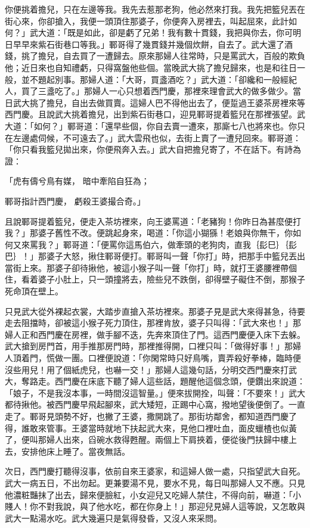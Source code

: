 你便挑着擔兒，只在左邊等我。我先去惹那老狗，他必然來打我。我先把籃兒丟在街心來，你卻搶入，我便一頭頂住那婆子，你便奔入房裡去，叫起屈來，此計如何？」武大道：「既是如此，卻是虧了兄弟！我有數十貫錢，我把與你去，你可明日早早來紫石街巷口等我。」鄆哥得了幾貫錢并幾個炊餅，自去了。武大還了酒錢，挑了擔兒，自去買了一遭歸去。原來那婦人往常時，只是罵武大，百般的欺負他；近日來也自知禮虧，只得窩盤他些個。當晚武大挑了擔兒歸來，也是和往日一般，並不題起別事。那婦人道：「大哥，買盞酒吃？」武大道：「卻纔和一般經紀人，買了三盞吃了。」那婦人一心只想着西門慶，那裡來理會武大的做多做少。當日武大挑了擔兒，自出去做買賣。這婦人巴不得他出去了，便踅過王婆茶房裡來等西門慶。且說武大挑着擔兒，出到紫石街巷口，迎見鄆哥提着籃兒在那裡張望。武大道：「如何？」鄆哥道：「還早些個，你自去賣一遭來，那廝七八也將來也。你只在左邊處伺候，不可遠去了。」武大雲飛也似，去街上賣了一遭兒回來。鄆哥道：「你只看我籃兒拋出來，你便飛奔入去。」武大自把擔兒寄了，不在話下。有詩為證：

「虎有儔兮鳥有媒，  暗中牽陷自狂為；

鄆哥指計西門慶，  虧殺王婆撮合奇。」

且說鄆哥提着籃兒，便走入茶坊裡來，向王婆罵道：「老豬狗！你昨日為甚麼便打我？」那婆子舊性不改。便跳起身來，喝道：「你這小猢猻！老娘與你無干，你如何又來罵我？」鄆哥道：「便罵你這馬伯六，做牽頭的老狗肉，直我｛髟巳｝｛髟巴｝！」那婆子大怒，揪住鄆哥便打。鄆哥叫一聲「你打」時，把那手中籃兒丟出當街上來。那婆子卻待揪他，被這小猴子叫一聲「你打」時，就打王婆腰裡帶個住，看着婆子小肚上，只一頭撞將去，險些兒不跌倒，卻得壁子礙住不倒，那猴子死命頂在壁上。

只見武大從外裸起衣裳，大踏步直搶入茶坊裡來。那婆子見是武大來得甚急，待要走去阻擋時，卻被這小猴子死力頂住，那裡肯放，婆子只叫得：「武大來也！」那婦人正和西門慶在房裡，做手腳不迭，先奔來頂住了門。這西門慶便入床下去躲。武大搶到房門首，用手推那房門時，那裡推得開，口裡只叫：「做得好事！」那婦人頂着門，慌做一團。口裡便說道：「你閑常時只好鳥嘴，賣弄殺好拳棒，臨時便沒些用兒！用了個紙虎兒，也嚇一交！」那婦人這幾句話，分明交西門慶來打武大，奪路走。西門慶在床底下聽了婦人這些話，題醒他這個念頭，便鑽出來說道：「娘子，不是我沒本事，一時間沒這智量。」便來拔開拴，叫聲：「不要來！」武大都待揪他。被西門慶早飛起腳來，武大矮短，正踢中心窩，撥地望後便倒了。一直走了。鄆哥見頭勢不好，也撇了王婆，撒開跳了。那街坊鄰舍，都知道西門慶了得，誰敢來管事。王婆當時就地下扶起武大來，見他口裡吐血，面皮蠟楂也似黃了，便叫那婦人出來，舀碗水救得甦醒。兩個上下肩挾着，便從後門扶歸中樓上去，安排他床上睡了。當夜無話。

次日，西門慶打聽得沒事，依前自來王婆家，和這婦人做一處，只指望武大自死。武大一病五日，不出勿起。更兼要湯不見，要水不見，每日叫那婦人又不應。只見他濃粧豔抹了出去，歸來便臉紅，小女迎兒又吃婦人禁住，不得向前，嚇道：「小賤人！你不對我說，與了他水吃，都在你身上！」那迎兒見婦人這等說，又怎敢與武大一點湯水吃。武大幾遍只是氣得發昏，又沒人來采問。

